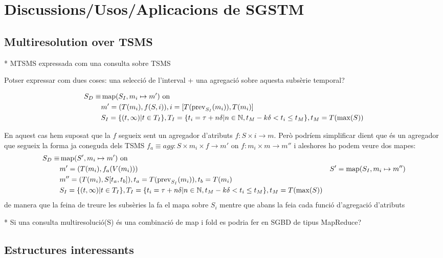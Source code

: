 \chapter{Discussions/Usos/Aplicacions de SGSTM}



\section{Multiresolution over TSMS}


* MTSMS expressada com una consulta  sobre TSMS

Potser expressar com dues coses: una selecció de l'interval + una agregació sobre aquesta subsèrie temporal?

  \begin{align*}
    S_D \equiv &  \operatorname{map}(S_I, m_i\mapsto m') \text{ on }  \\
    & m' = (T(m_i), f(S, i)), i = [T(\operatorname{prev}_{S_I}(m_i)),T(m_i)] \\
    &  S_I = \{ (t,\infty) | t\in T_I  \}, T_I = \{ t_i = \tau+n\delta | n\in\mathbb{N}, t_M - k\delta < t_i \leq t_M \}, t_M = T(\max(S))
  \end{align*}
  
En aquest cas hem suposat que la $f$ segueix sent un agregador d'atributs $f:S\times i\rightarrow m$. Però podríem simplificar dient que és un agregador que segueix la forma ja coneguda dels TSMS $f_a \equiv agg:S\times m_i \times f \rightarrow m'$ on $f:m_i\times m\rightarrow m''$ i aleshores ho podem veure dos mapes:
  \begin{align*}
    S_D \equiv &  \operatorname{map}(S', m_i\mapsto m') \text{ on }  \\
    & m' = (T(m_i), f_a(V(m_i)))
    & S' = \operatorname{map}(S_I, m_i\mapsto m'') \\
    & m'' = (T(m_i), S[t_a,t_b]), t_a = T(\operatorname{prev}_{S_I}(m_i)), t_b=T(m_i) \\
    &  S_I = \{ (t,\infty) | t\in T_I  \}, T_I = \{ t_i = \tau+n\delta | n\in\mathbb{N}, t_M - k\delta < t_i \leq t_M \}, t_M = T(\max(S))
  \end{align*}
de manera que la feina de treure les subsèries la fa el mapa sobre $S_i$ mentre que abans la feia cada funció d'agregació d'atributs



* Si una consulta multiresolució(S) és una combinació de map i fold es podria fer en SGBD de tipus MapReduce?


\section{Estructures interessants}



